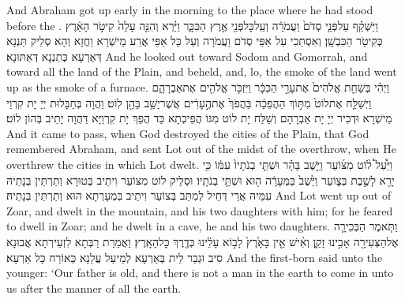 {And Abraham got up early in the morning to the place where he had stood before the \lord.}{}
{וַיַּשְׁקֵ֗ף עַל\maqqaf פְּנֵ֤י סְדֹם֙ וַעֲמֹרָ֔ה וְעַֽל\maqqaf כׇּל\maqqaf פְּנֵ֖י אֶ֣רֶץ הַכִּכָּ֑ר וַיַּ֗רְא וְהִנֵּ֤ה עָלָה֙ קִיטֹ֣ר הָאָ֔רֶץ כְּקִיטֹ֖ר הַכִּבְשָֽׁן׃}
{וְאִסְתַּכִי עַל אַפֵּי סְדֹם וַעֲמֹרָה וְעַל כָּל אַפֵּי אֲרַע מֵישְׁרָא וַחֲזָא וְהָא סְלֵיק תַּנְנָא דְּאַרְעָא כְּתַנְנָא דְּאַתּוּנָא׃}
{And he looked out toward Sodom and Gomorrah, and toward all the land of the Plain, and beheld, and, lo, the smoke of the land went up as the smoke of a furnace.}{}
{וַיְהִ֗י בְּשַׁחֵ֤ת אֱלֹהִים֙ אֶת\maqqaf עָרֵ֣י הַכִּכָּ֔ר וַיִּזְכֹּ֥ר אֱלֹהִ֖ים אֶת\maqqaf אַבְרָהָ֑ם וַיְשַׁלַּ֤ח אֶת\maqqaf לוֹט֙ מִתּ֣וֹךְ הַהֲפֵכָ֔ה בַּהֲפֹךְ֙ אֶת\maqqaf הֶ֣עָרִ֔ים אֲשֶׁר\maqqaf יָשַׁ֥ב בָּהֵ֖ן לֽוֹט׃}
{וַהֲוָה בְּחַבָּלוּת יְיָ יָת קִרְוֵי מֵישְׁרָא וּדְכִיר יְיָ יָת אַבְרָהָם וְשַׁלַּח יָת לוֹט מִגּוֹ הֲפֵיכְתָא כַּד הֲפַךְ יָת קִרְוַיָּא דַּהֲוָה יָתֵיב בְּהוֹן לוֹט׃}
{And it came to pass, when God destroyed the cities of the Plain, that God remembered Abraham, and sent Lot out of the midst of the overthrow, when He overthrew the cities in which Lot dwelt.}{}
{וַיַּ֩עַל֩ ל֨וֹט מִצּ֜וֹעַר וַיֵּ֣שֶׁב בָּהָ֗ר וּשְׁתֵּ֤י בְנֹתָיו֙ עִמּ֔וֹ כִּ֥י יָרֵ֖א לָשֶׁ֣בֶת בְּצ֑וֹעַר וַיֵּ֙שֶׁב֙ בַּמְּעָרָ֔ה ה֖וּא וּשְׁתֵּ֥י בְנֹתָֽיו׃}
{וּסְלֵיק לוֹט מִצּוֹעַר וִיתֵיב בְּטוּרָא וְתַרְתֵּין בְּנָתֵיהּ עִמֵּיהּ אֲרֵי דְּחֵיל לְמִתַּב בְּצוֹעַר וִיתֵיב בִּמְעָרְתָא הוּא וְתַרְתֵּין בְּנָתֵיהּ׃}
{And Lot went up out of Zoar, and dwelt in the mountain, and his two daughters with him; for he feared to dwell in Zoar; and he dwelt in a cave, he and his two daughters.}{}
{וַתֹּ֧אמֶר הַבְּכִירָ֛ה אֶל\maqqaf הַצְּעִירָ֖ה אָבִ֣ינוּ זָקֵ֑ן וְאִ֨ישׁ אֵ֤ין בָּאָ֙רֶץ֙ לָב֣וֹא עָלֵ֔ינוּ כְּדֶ֖רֶךְ כׇּל\maqqaf הָאָֽרֶץ׃}
{וַאֲמַרַת רַבְּתָא לִזְעֵירְתָא אֲבוּנָא סִיב וּגְבַר לֵית בְּאַרְעָא לְמֵיעַל עֲלַנָא כְּאוֹרַח כָּל אַרְעָא׃}
{And the first-born said unto the younger: ‘Our father is old, and there is not a man in the earth to come in unto us after the manner of all the earth.}{}
